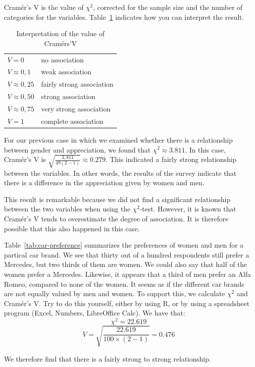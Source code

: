 Cramér's V is the value of $\chi^{2}$, corrected for the sample size and the number of categories for the variables. Table~\ref{tab:interpretation-cramers-v} indicates how you can interpret the result.

\begin{table}
  \centering
  \begin{tabular}{ll}
    $V = 0$ & no association \\
    $V \approx 0,1$ & weak association \\
    $V \approx 0,25$ & fairly strong association \\
    $V \approx 0,50$ & strong association \\
    $V \approx 0,75$ & very strong association \\
    $V = 1$ & complete association \\
  \end{tabular}
  \caption{Interpretation of the value of Cramérs'V}
  \label{tab:interpretation-cramers-v}
\end{table}

For our previous case in which we examined whether there is a relationship between gender and appreciation, we found that $\chi^{2} \approx 3.811$. In this case, Cramér's V is $\sqrt{\frac{3,811}{49 (2 - 1)}} \approx 0.279$. This indicated a fairly strong relationship between the variables. In other words, the results of the survey indicate that there is a difference in the appreciation given by women and men.

This result is remarkable because we did not find a significant relationship between the two variables when using the $\chi^2$-test. However, it is known that Cramér's V tends to overestimate the degree of association. It is therefore possible that this also happened in this case.

\begin{example}
  Table~\ref{tab:car-preference} summarizes the preferences of women and men for a partical car brand. We see that thirty out of a hundred respondents still prefer a Mercedes, but two thirds of them are women. We could also say that half of the women prefer a Mercedes. Likewise, it appears that a third of men prefer an Alfa Romeo, compared to none of the women. It seems as if the different car brands are not equally valued by men and women. To support this, we calculate $\chi^{2}$ and Cramér's V. Try to do this yourself, either by using R, or by using a spreadsheet program (Excel, Numbers, LibreOffice Calc). We have that:
  \[ \chi^{2} = 22.619 \]
  \[ V = \sqrt{\frac{22.619}{100 \times (2-1)}}  = 0.476\]
  
  We therefore find that there is a fairly strong to strong relationship.
\end{example}

